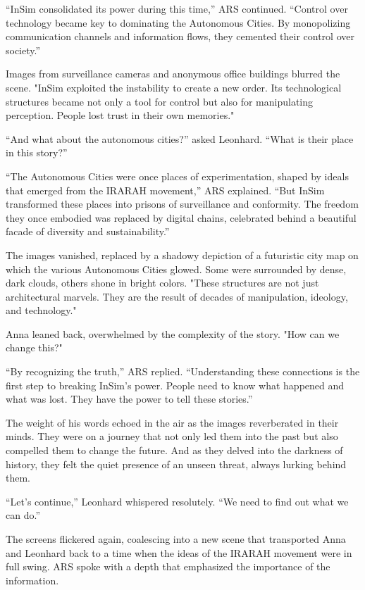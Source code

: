 \documentclass[
]{article}
\begin{document}
``InSim consolidated its power during this time,'' ARS continued. ``Control over technology became key to dominating the Autonomous Cities. By monopolizing communication channels and information flows, they cemented their control over society.''

Images from surveillance cameras and anonymous office buildings blurred the scene. "InSim exploited the instability to create a new order. Its technological structures became not only a tool for control but also for manipulating perception. People lost trust in their own memories."

``And what about the autonomous cities?'' asked Leonhard. ``What is their place in this story?''

``The Autonomous Cities were once places of experimentation, shaped by ideals that emerged from the IRARAH movement,'' ARS explained. ``But InSim transformed these places into prisons of surveillance and conformity. The freedom they once embodied was replaced by digital chains, celebrated behind a beautiful facade of diversity and sustainability.''

The images vanished, replaced by a shadowy depiction of a futuristic city map on which the various Autonomous Cities glowed. Some were surrounded by dense, dark clouds, others shone in bright colors. "These structures are not just architectural marvels. They are the result of decades of manipulation, ideology, and technology."

Anna leaned back, overwhelmed by the complexity of the story. "How can we change this?"

``By recognizing the truth,'' ARS replied. ``Understanding these connections is the first step to breaking InSim's power. People need to know what happened and what was lost. They have the power to tell these stories.''

The weight of his words echoed in the air as the images reverberated in their minds. They were on a journey that not only led them into the past but also compelled them to change the future. And as they delved into the darkness of history, they felt the quiet presence of an unseen threat, always lurking behind them.

``Let's continue,'' Leonhard whispered resolutely. ``We need to find out what we can do.''

The screens flickered again, coalescing into a new scene that transported Anna and Leonhard back to a time when the ideas of the IRARAH movement were in full swing. ARS spoke with a depth that emphasized the importance of the information.
\end{document}
